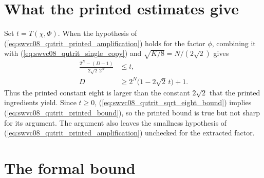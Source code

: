 \documentclass{article}
\begin{document}
\section{What the printed estimates give}

Set $t=T(\chi,\Phi)$. When the hypothesis of
(\ref{eq:swvc08_qutrit_printed_amplification}) holds for the factor $\phi$,
combining it with (\ref{eq:swvc08_qutrit_single_copy}) and
$\sqrt{K/8}=N/(2\sqrt2)$ gives
\begin{align}
    \frac{2^N-(D-1)}{2\sqrt2\,2^N} & \le t,
    \label{eq:swvc08_qutrit_printed_combination} \\
    D                              & \ge2^N\bigl(1-2\sqrt2\,t\bigr)+1.
    \label{eq:swvc08_qutrit_sqrt_eight_bound}
\end{align}
Thus the printed constant eight is larger than the constant $2\sqrt2$ that
the printed ingredients yield. Since $t\ge0$,
(\ref{eq:swvc08_qutrit_sqrt_eight_bound}) implies
(\ref{eq:swvc08_qutrit_printed_bound}), so the printed bound is true but not
sharp for its argument. The argument also leaves the smallness hypothesis of
(\ref{eq:swvc08_qutrit_printed_amplification}) unchecked for the extracted
factor.

\section{The formal bound}
\end{document}
